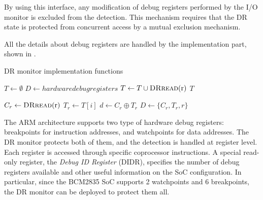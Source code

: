 By using this interface, any modification of debug registers performed by the I/O monitor is excluded from the detection.
This mechanism requires that the DR state is protected from concurrent access by a mutual exclusion mechanism.

All the details about debug registers are handled by the implementation part, shown in .
\begin{algorithm}[h]
\caption{DR monitor implementation functions}
\label{alg:dr_impl}
\begin{algorithmic}[1]
 
	\State $T \gets \emptyset$
	\State $D \gets hardware debug registers$
		\State $T \gets T \cup \Call{DRread}{$r$}$ 
	\EndFor
	\State \Return $T$
\EndFunction
\Statex
\end{algorithmic}

\begin{algorithmic}[1]
 
		\State $C_r \gets \Call{DRread}{$r$}$ 
		\State $T_r \gets T[i]$ 
		\State $d \gets C_r \oplus T_r$ 
			\State $D \gets \{C_r, T_r, r\}$ 
			\State {} 
		\EndIf
	\EndFor
\EndFunction
\Statex
\end{algorithmic}

\begin{algorithmic}[1]
	\State {} 
\EndFunction
\end{algorithmic}
\end{algorithm}
The ARM architecture supports two type of hardware debug registers: breakpoints for instruction addresses, and watchpoints for data addresses.
The DR monitor protects both of them, and the detection is handled at register level. Each register is accessed through specific coprocessor instructions.
A special read-only register, the \emph{Debug ID Register} (DIDR), specifies the number of debug registers available and other useful information on the SoC configuration.
In particular, since the BCM2835 SoC supports 2 watchpoints and 6 breakpoints, the DR monitor can be deployed to protect them all.


